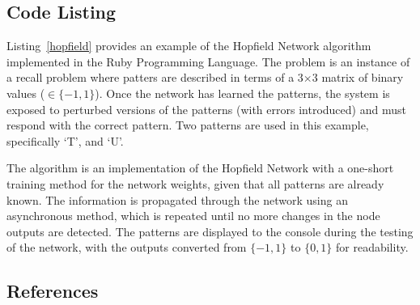 \subsection{Code Listing}
Listing~\ref{hopfield} provides an example of the Hopfield Network algorithm implemented in the Ruby Programming Language. 
The problem is an instance of a recall problem where patters are described in terms of a 3$\times$3 matrix of binary values ($\in \{-1,1\}$). Once the network has learned the patterns, the system is exposed to perturbed versions of the patterns (with errors introduced) and must respond with the correct pattern. Two patterns are used in this example, specifically `T', and `U'.

The algorithm is an implementation of the Hopfield Network with a one-short training method for the network weights, given that all patterns are already known. The information is propagated through the network using an asynchronous method, which is repeated until no more changes in the node outputs are detected. The patterns are displayed to the console during the testing of the network, with the outputs converted from $\{-1,1\}$ to $\{0,1\}$ for readability.



\subsection{References}

